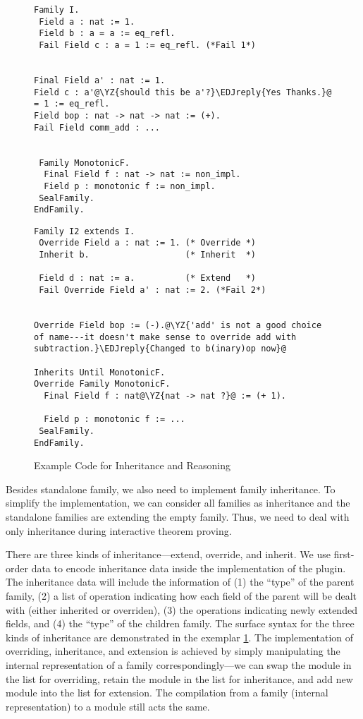 \begin{figure}[!htb]
  \begin{minipage}[t]{0.45\linewidth}
\begin{verbatim}
Family I.
 Field a : nat := 1.
 Field b : a = a := eq_refl.
 Fail Field c : a = 1 := eq_refl. (*Fail 1*)


Final Field a' : nat := 1.
Field c : a'@\YZ{should this be a'?}\EDJreply{Yes Thanks.}@ = 1 := eq_refl.
Field bop : nat -> nat -> nat := (+).
Fail Field comm_add : ...


 Family MonotonicF.
  Final Field f : nat -> nat := non_impl.
  Field p : monotonic f := non_impl.
 SealFamily. 
EndFamily.
\end{verbatim}
  \end{minipage}
\begin{minipage}[t]{0.45\linewidth}
\begin{verbatim}
Family I2 extends I.
 Override Field a : nat := 1. (* Override *)
 Inherit b.                   (* Inherit  *)

 Field d : nat := a.          (* Extend   *)
 Fail Override Field a' : nat := 2. (*Fail 2*)


Override Field bop := (-).@\YZ{'add' is not a good choice of name---it doesn't make sense to override add with subtraction.}\EDJreply{Changed to b(inary)op now}@

Inherits Until MonotonicF.
Override Family MonotonicF.
  Final Field f : nat@\YZ{nat -> nat ?}@ := (+ 1).

  Field p : monotonic f := ...
 SealFamily. 
EndFamily.
\end{verbatim}
  \end{minipage}
  \caption{Example Code for Inheritance and Reasoning}\label{fig:plugin-example3}
\end{figure}

Besides standalone family, we also need to implement family inheritance.
To simplify the implementation, we can consider all families as
inheritance and the standalone families are extending the empty family.
Thus, we need to deal with only inheritance during interactive theorem proving.


There are three kinds of inheritance---extend, override, and inherit. We
use first-order data to encode inheritance data inside the
implementation of the plugin. The inheritance data will include the
information of (1) the ``type'' of the parent family, (2) a list of
operation indicating how each field of the parent will be dealt with
(either inherited or overriden), (3) the operations indicating newly
extended fields, and (4) the ``type'' of the children family.
The surface syntax for the three kinds of inheritance
are demonstrated in the exemplar \cref*{fig:plugin-example3}. The
implementation of overriding, inheritance, and extension is achieved by
simply manipulating the internal representation of a family
correspondingly---we can swap the module in the list for overriding,
retain the module in the list for inheritance, and add new module into
the list for extension. The compilation from a family (internal
representation) to a module still acts the same.

